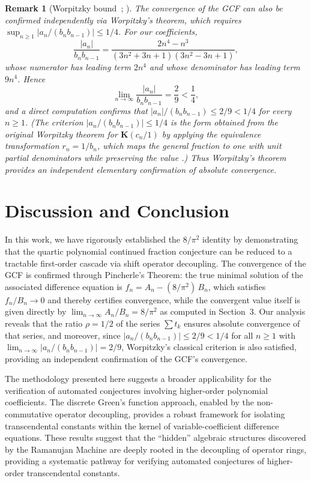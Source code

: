 \documentclass[pdflatex,sn-mathphys-num]{sn-jnl}
\theoremstyle{thmstyleone}
\theoremstyle{thmstyletwo}
\newtheorem{remark}{Remark}
\theoremstyle{thmstylethree}
\begin{document}
	\begin{remark}[Worpitzky bound~{\cite[Thm.\,4.29]{wall1948analytic}; \cite[Thm.\,3.2.5]{lorentzen1992continued}}]
		The convergence of the GCF can also be confirmed independently via Worpitzky's theorem, which requires $\sup_{n \ge 1} |a_n / (b_n b_{n-1})| \le 1/4$. For our coefficients,
		\[
		\frac{|a_n|}{b_n b_{n-1}} = \frac{2n^4 - n^3}{(3n^2+3n+1)(3n^2-3n+1)},
		\]
		whose numerator has leading term $2n^4$ and whose denominator has leading term $9n^4$. Hence
		\[
		\lim_{n \to \infty} \frac{|a_n|}{b_n b_{n-1}} = \frac{2}{9} < \frac{1}{4},
		\]
		and a direct computation confirms that $|a_n|/(b_n b_{n-1}) \le 2/9 < 1/4$ for every $n \ge 1$. (The criterion $|a_n/(b_n b_{n-1})|\le 1/4$ is the form obtained from the original Worpitzky theorem for $\mathbf{K}(c_n/1)$ by applying the equivalence transformation $r_n = 1/b_n$, which maps the general fraction to one with unit partial denominators while preserving the value \cite[Thm.\,2.1]{wall1948analytic}.) Thus Worpitzky's theorem provides an independent elementary confirmation of absolute convergence.
	\end{remark}
	
	\section{Discussion and Conclusion}
	In this work, we have rigorously established the $8/\pi^2$ identity by demonstrating that the quartic polynomial continued fraction conjecture can be reduced to a tractable first-order cascade via shift operator decoupling. The convergence of the GCF is confirmed through Pincherle's Theorem: the true minimal solution of the associated difference equation is $f_n = A_n - (8/\pi^2)\,B_n$, which satisfies $f_n/B_n \to 0$ and thereby certifies convergence, while the convergent value itself is given directly by $\lim_{n\to\infty} A_n/B_n = 8/\pi^2$ as computed in Section~3. Our analysis reveals that the ratio $\rho = 1/2$ of the series $\sum t_k$ ensures absolute convergence of that series, and moreover, since $|a_n/(b_n b_{n-1})| \le 2/9 < 1/4$ for all $n \ge 1$ with $\lim_{n\to\infty} |a_n/(b_n b_{n-1})| = 2/9$, Worpitzky's classical criterion is also satisfied, providing an independent confirmation of the GCF's convergence.
	
	The methodology presented here suggests a broader applicability for the verification of automated conjectures involving higher-order polynomial coefficients. The discrete Green's function approach, enabled by the non-commutative operator decoupling, provides a robust framework for isolating transcendental constants within the kernel of variable-coefficient difference equations. These results suggest that the ``hidden'' algebraic structures discovered by the Ramanujan Machine are deeply rooted in the decoupling of operator rings, providing a systematic pathway for verifying automated conjectures of higher-order transcendental constants.
	
\end{document}
